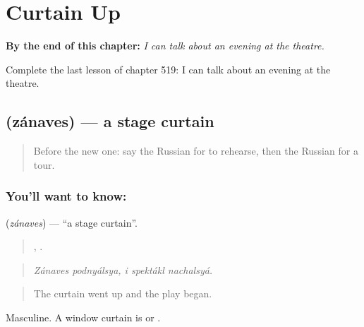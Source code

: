 
\chapter{Curtain Up}
\label{ch:ru-curtain-up}

\begin{chapteropening}
\textbf{By the end of this chapter:} \emph{I can talk about an evening at the theatre.}

Complete the last lesson of chapter 519: I can talk about an evening at the theatre.
\end{chapteropening}

\section[\texorpdfstring{\ru{занавес} (zánaves)}{занавес (zánaves)}]{ (zánaves) — a stage curtain}

\label{lesson:RU-C519-zanaves}



\begin{quote}
Before the new one: say the Russian for to rehearse, then the Russian for a tour.
\end{quote}

\subsection*{You'll want to know: }
\textbf{} (\emph{zánaves}) — \textquotedblleft{}a stage curtain\textquotedblright{}.

\begin{quote}
 ,   .
\end{quote}

\begin{quote}
\emph{Zánaves podnyálsya, i spektákl nachalsyá.}
\end{quote}

\begin{quote}
The curtain went up and the play began.
\end{quote}

Masculine. A window curtain is \emph{} or \emph{}.

